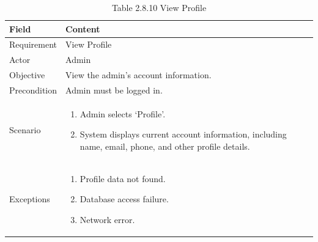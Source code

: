 \documentclass[12pt,oneside]{report}
\begin{document}
\begin{table}[H]
\begin{tabularx}{\textwidth}{|p{3cm}|X|}
\end{tabularx}
\end{table}

\begin{table}[H]
\centering
\caption{Table 2.8.10 View Profile}
\label{tab:admin-view-profile}
\begin{tabularx}{\textwidth}{|p{3cm}|X|}
\hline
\textbf{Field} & \textbf{Content} \\ \hline

Requirement & View Profile \\ \hline

Actor & Admin \\ \hline

Objective & View the admin’s account information. \\ \hline

Precondition & Admin must be logged in. \\ \hline

Scenario &
\begin{minipage}[t]{0.75\textwidth}
\begin{enumerate}[leftmargin=*,label=\arabic*.]
\item Admin selects ‘Profile’.
\item System displays current account information, including name, email, phone, and other profile details.
\end{enumerate}
\end{minipage} \\ \hline

Exceptions &
\begin{minipage}[t]{0.75\textwidth}
\begin{enumerate}[leftmargin=*,label=\arabic*.]
\item Profile data not found.
\item Database access failure.
\item Network error.
\end{enumerate}
\end{minipage} \\ \hline

\end{tabularx}
\end{table}
\end{document}
